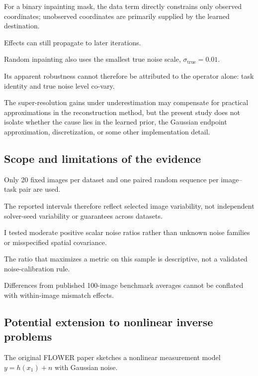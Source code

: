\documentclass[11pt,a4paper]{article}
\newcommand{\sx}{\sigma_{\mathrm{true}}}
\begin{document}
For a binary inpainting mask, the data term directly constrains
only observed coordinates; unobserved coordinates are primarily
supplied by the learned destination.

Effects can still propagate to later iterations.

Random inpainting also uses the smallest true noise scale,
$\sx=0.01$.

Its apparent robustness cannot therefore be attributed to the
operator alone: task identity and true noise level co-vary.

The super-resolution gains under underestimation may compensate for
practical approximations in the reconstruction method, but the present
study does not isolate whether the cause lies in the learned prior,
the Gaussian endpoint approximation, discretization, or some other
implementation detail.



\subsection{Scope and limitations of the evidence}

Only 20 fixed images per dataset and one paired random sequence
per image--task pair are used.

The reported intervals therefore reflect selected image variability,
not independent solver-seed variability or guarantees across datasets.

I tested moderate positive scalar noise ratios rather than
unknown noise families or misspecified spatial covariance.

The ratio that maximizes a metric on this sample is descriptive,
not a validated noise-calibration rule.

Differences from published 100-image benchmark averages cannot be
conflated with within-image mismatch effects.



\subsection{Potential extension to nonlinear inverse problems}

The original FLOWER paper sketches a nonlinear measurement model
$y=h(x_1)+n$ with Gaussian noise.
\end{document}
